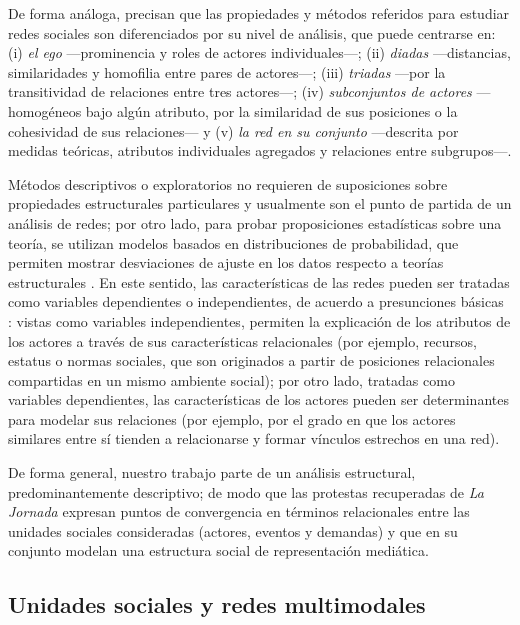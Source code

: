 \documentclass[letterpaper, 11pt]{book}
\theoremstyle{definition}
\theoremstyle{remark}
\begin{document}
De forma análoga, \citet{1994_Wasserman_SNA} precisan que las propiedades y métodos referidos para estudiar redes sociales son diferenciados por su nivel de análisis, que puede centrarse en: 
(i) \emph{el ego} ---prominencia y roles de actores individuales---; 
(ii) \emph{diadas} ---distancias, similaridades y homofilia entre pares de actores---; 
(iii) \emph{triadas} ---por la transitividad de relaciones entre tres actores---; 
(iv) \emph{subconjuntos de actores} ---homogéneos bajo algún atributo, por la similaridad de sus posiciones o la cohesividad de sus relaciones--- y 
(v) \emph{la red en su conjunto} ---descrita por medidas teóricas, atributos individuales agregados y relaciones entre subgrupos---.


Métodos descriptivos o exploratorios no requieren de suposiciones sobre propiedades estructurales particulares y usualmente son el punto de partida de un análisis de redes; por otro lado, para probar proposiciones estadísticas sobre una teoría, se utilizan modelos basados en distribuciones de probabilidad, que permiten mostrar desviaciones de ajuste en los datos respecto a teorías estructurales \citep[505]{1994_Wasserman_SNA}. 
En este sentido, las características de las redes pueden ser tratadas como variables dependientes o independientes, de acuerdo a presunciones básicas \citep[372--373]{2014_Caiani_SNA}: 
vistas como variables independientes, permiten la explicación de los atributos de los actores a través de sus características relacionales (por ejemplo, recursos, estatus o normas sociales, que son originados a partir de posiciones relacionales compartidas en un mismo ambiente social); 
por otro lado, tratadas como variables dependientes, las características de los actores pueden ser determinantes para modelar sus relaciones (por ejemplo, por el grado en que los actores similares entre sí tienden a relacionarse y formar vínculos estrechos en una red).


De forma general, nuestro trabajo parte de un análisis estructural, predominantemente descriptivo; de modo que las protestas recuperadas de \emph{La Jornada} expresan puntos de convergencia en términos relacionales entre las unidades sociales consideradas (actores, eventos y demandas) y que en su conjunto modelan una estructura social de representación mediática. 




\subsection{Unidades sociales y redes multimodales}
\label{sec:UnidadesSociales}
\end{document}

